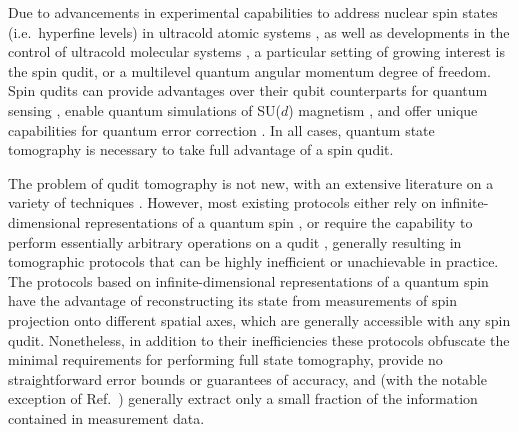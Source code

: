\documentclass[nofootinbib,twocolumn]{revtex4-1}
\begin{document}
Due to advancements in experimental capabilities to address nuclear spin states (i.e.~hyperfine levels) in ultracold atomic systems \cite{daley2011quantum, mischuck2012control, smith2013quantum, cazalilla2014ultracold}, as well as developments in the control of ultracold molecular systems \cite{bohn2017cold, zeppenfeld2012sisyphus, kozyryev2017sisyphus, puri2017synthesis, wu2017cryofuge, marco2019degenerate, liu2019molecular, anderegg2019optical, chou2020frequencycomb, lin2020quantum}, a particular setting of growing interest is the spin qudit, or a multilevel quantum angular momentum degree of freedom.
Spin qudits can provide advantages over their qubit counterparts for quantum sensing \cite{hemmer2018squeezing, evrard2019enhanced}, enable quantum simulations of SU($d$) magnetism \cite{cazalilla2014ultracold, banerjee2013atomic, zhang2014spectroscopic, scazza2014observation, goban2018emergence}, %
and offer unique capabilities for quantum error correction \cite{albert2020robust, gross2021designing}.
In all cases, quantum state tomography is necessary to take full advantage of a spin qudit.


The problem of qudit tomography is not new, with an extensive literature on a variety of techniques \cite{newton1968measurability, hofmann2004quantumstate, filippov2010inverse, schmied2011tomographic, evrard2019enhanced, flammia2005minimal, thew2002qudit, salazar2012quantum, sosa-martinez2017quantum, ha2018minimal, stefano2019set, palici2020oam, filippov2010inverse, hofmann2004quantumstate, filippov2010inverse}.
However, most existing protocols either rely on infinite-dimensional representations of a quantum spin \cite{manko1997spin, schmied2011tomographic, evrard2019enhanced}, or require the capability to perform essentially arbitrary operations on a qudit \cite{thew2002qudit, flammia2005minimal, salazar2012quantum, sosa-martinez2017quantum, ha2018minimal, stefano2019set, palici2020oam}, generally resulting in tomographic protocols that can be highly inefficient or unachievable in practice.
The protocols based on infinite-dimensional representations of a quantum spin have the advantage of reconstructing its state from measurements of spin projection onto different spatial axes, which are generally accessible with any spin qudit.
Nonetheless, in addition to their inefficiencies these protocols obfuscate the minimal requirements for performing full state tomography, provide no straightforward error bounds or guarantees of accuracy, and (with the notable exception of Ref.~\cite{schmied2011tomographic}) generally extract only a small fraction of the information contained in measurement data.
\end{document}
